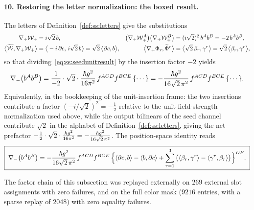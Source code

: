 \paragraph{10. Restoring the letter normalization: the boxed result.}
The letters of Definition~\ref{def:ss:letters} give the substitutions
\begin{align}
\nabla_{+}\mathcal{W}_{+}&=i\sqrt2\,b,
&\big(\nabla_{+}\mathcal{W}_{+}^{A}\big)\big(\nabla_{+}\mathcal{W}_{+}^{B}\big)
&=(i\sqrt2)^{2}\,b^{A}b^{B}=-2\,b^{A}b^{B},
\label{eq:ss:seedlettersub}\\
\big\langle\widetilde{\mathcal{W}},\nabla_{+}\mathcal{W}_{+}\big\rangle
&=\big\langle-i\,\partial c,\,i\sqrt2\,b\big\rangle
=\sqrt2\,\big\langle\partial c,b\big\rangle,
&\big\langle\nabla_{+}\Phi_r,\widetilde\Phi^{r}\big\rangle
&=\big\langle\sqrt2\,\beta_r,\gamma^{r}\big\rangle
=\sqrt2\,\big\langle\beta_r,\gamma^{r}\big\rangle ,
\label{eq:ss:seedwordsub}
\end{align}
so that dividing~\eqref{eq:ss:seedunitresult} by the insertion factor $-2$
yields
\begin{equation}\label{eq:ss:seednetletter}
\nabla_{-}\big(b^{A}b^{B}\big)
=\frac{1}{-2}\cdot\sqrt2\cdot\frac{\hbar g^{2}}{16\pi^{2}}\,
f^{ACD}f^{BCE}\,\{\cdots\}
=-\frac{\hbar g^{2}}{16\sqrt2\,\pi^{2}}\,f^{ACD}f^{BCE}\,\{\cdots\} .
\end{equation}
Equivalently, in the bookkeeping of the unit-insertion frame: the two
insertions contribute a factor $(-i/\sqrt2)^{2}=-\tfrac12$ relative to the
unit field-strength normalization used above, while the output bilinears of
the seed channel contribute $\sqrt2$ in the alphabet of
Definition~\ref{def:ss:letters}, giving the net prefactor
$-\tfrac12\cdot\sqrt2\cdot\tfrac{\hbar g^2}{16\pi^2}
=-\tfrac{\hbar g^{2}}{16\sqrt2\,\pi^{2}}$. The position-space identity reads
\begin{equation}\label{eq:ss:bbresult}
\boxed{\;
\nabla_{-}\big(b^{A}b^{B}\big)
=-\frac{\hbar g^{2}}{16\sqrt2\,\pi^{2}}\,
f^{ACD}f^{BCE}\,
\Big\{
\langle\partial c,b\rangle-\langle b,\partial c\rangle
+\sum_{r=1}^{3}\big(
\langle\beta_{r},\gamma^{r}\rangle-\langle\gamma^{r},\beta_{r}\rangle
\big)\Big\}^{DE} .\;}
\end{equation}

\begin{remark}\label{rem:ss:seedchecks}
The factor chain of this subsection was replayed externally on $269$ external
slot assignments with zero failures, and on the full color mask ($9216$
entries, with a sparse replay of $2048$) with zero equality failures.
\end{remark}

